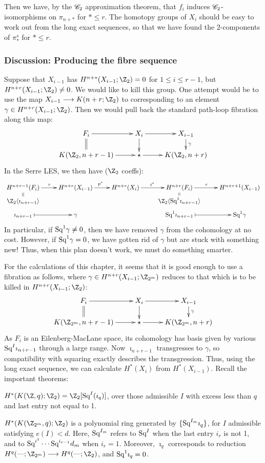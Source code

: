 \documentclass[11pt]{article}
\begin{document}
Then we have, by the $\mathscr{C}_2$ approximation theorem, that $f_i$ induces 
$\mathscr{C}_2$-isomorphisms on $\pi_{n+*}$ for $*\leq r$. The homotopy groups
of $X_i$ should be easy to work out from the long exact sequences, so that we
have found the $2$-components of $\pi_*^s$ for $*\leq r$.

\subsubsection{Discussion: Producing the fibre sequence}
Suppose that $X_{i-1}$ has $H^{n+*}(X_{i-1};\Z_2)=0$ for $1\leq i\leq r-1$, but
 $H^{n+r}(X_{i-1};\Z_2)\neq0$. We would like to kill this group. One attempt
would be to use the map $X_{i-1}\to K(n+r;\Z_2)$ to corresponding to an element
$\gamma\in H^{n+r}(X_{i-1};\Z_2)$. Then we would pull back the standard
path-loop fibration along this map:
\[\xymatrix@R=5mm{
F_i\ar[r]\ar@{=}[d]&
X_i\ar[d]\ar[r]&
X_{i-1}\ar[d]^\gamma\\
K(\Z_2,n+r-1)\ar[r]&\star\ar[r]&K(\Z_2,n+r)
}\]
In the Serre LES, we then have ($\Z_2$ coeffs):
\[\xymatrix@R=1.5mm{
H^{n+r-1}(F_i)\ar@{->}[r]^{\tau}&
H^{n+r}(X_{i-1})\ar[r]^{p^*}&
H^{n+r}(X_i)\ar[r]^{i^*}&
H^{n+r}(F_i)\ar@{->}[r]^{\tau\ \ \ }&%
H^{n+r+1}(X_{i-1})\\
\Z_2\langle\imath_{n+r-1}\rangle\ar@{=}[u]&
&&
\Z_2\langle\Squ^1\imath_{n+r-1}\rangle\ar@{=}[u]\\
\imath_{n+r-1}\ar@{|->}[r]&\gamma&&
\Squ^1\imath_{n+r-1}\ar@{|->}[r]&\Squ^1\gamma
}\]
In particular, if $\textup{Sq}^1\gamma\neq0$, then we have removed $\gamma$ from the 
cohomology at no cost. However, if $\textup{Sq}^1\gamma=0$, we have gotten rid of 
$\gamma$ but are stuck with something new! Thus, when this plan doesn't work, 
we must do something smarter.

For the calculations of this chapter, it seems that it is good enough to use a
fibration as follows, where $\gamma\in H^{n+r}(X_{i-1};\Z_{2^m})$ reduces to that
which is to be killed in $H^{n+r}(X_{i-1};\Z_2)$:
\[\xymatrix@R=5mm{
F_i\ar[r]\ar@{=}[d]&
X_i\ar[d]\ar[r]&
X_{i-1}\ar[d]^\gamma\\
K(\Z_{2^m},n+r-1)\ar[r]&\star\ar[r]&K(\Z_{2^m},n+r)
}\]
As $F_i$ is an Eilenberg-MacLane space, its cohomology has basis given by 
various $\textup{Sq}^I\imath_{n+r-1}$ through a large range.
Now $\imath_{n+r-1}$ transgresses to $\gamma$, so compatibility with squaring
exactly describes the transgression.
Thus, using the long exact sequence, we can calculate $H^*(X_i)$ from 
$H^*(X_{i-1})$.
Recall the important theorems:
\begin{thm*}$H^*(K(\Z,q);\Z_2)=\Z_2[\Squ^I(\imath_q)]$, over those admissible $I$
 with excess less than $q$ and last entry not equal to 1.
\end{thm*}
\begin{thm*}
$H^*(K(\Z_{2^m},q);\Z_2)$ is a polynomial ring generated by
$\{\textup{Sq}^{I_m}\imath_q\}$, for $I$ admissible satisfying $e(I)<d$. Here,
$\textup{Sq}^{I_m}$ refers to $\textup{Sq}^I$ when the last entry $i_r$ is not 1, and to
$\textup{Sq}^{i^1}\cdots \textup{Sq}^{i_{r-1}}d_m$ when $i_r=1$. Moreover, $\imath_q$ corresponds
to reduction $H^q(\DASH;\Z_{2^m})\to H^q(\DASH;\Z_{2})$, and $\textup{Sq}^1\imath_q=0$.
\end{thm*}
\end{document}
